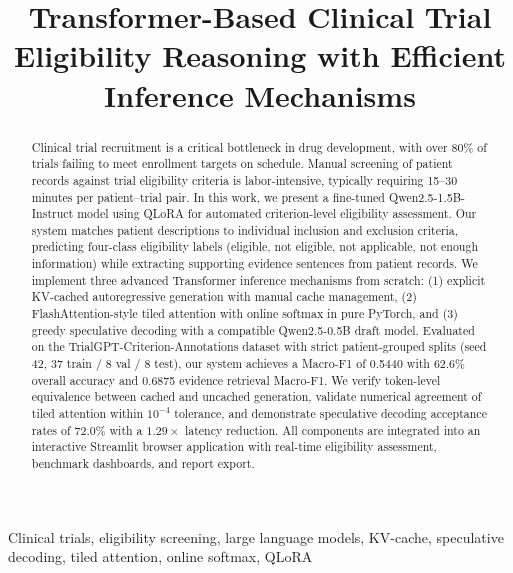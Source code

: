 \documentclass[conference]{IEEEtran}
\begin{document}
\title{Transformer-Based Clinical Trial Eligibility Reasoning with Efficient Inference Mechanisms}

\author{
}

\maketitle

\begin{abstract}
Clinical trial recruitment is a critical bottleneck in drug development, with over 80\% of trials failing to meet enrollment targets on schedule. Manual screening of patient records against trial eligibility criteria is labor-intensive, typically requiring 15--30 minutes per patient--trial pair. In this work, we present a fine-tuned Qwen2.5-1.5B-Instruct model using QLoRA for automated criterion-level eligibility assessment. Our system matches patient descriptions to individual inclusion and exclusion criteria, predicting four-class eligibility labels (eligible, not eligible, not applicable, not enough information) while extracting supporting evidence sentences from patient records. We implement three advanced Transformer inference mechanisms from scratch: (1) explicit KV-cached autoregressive generation with manual cache management, (2) FlashAttention-style tiled attention with online softmax in pure PyTorch, and (3) greedy speculative decoding with a compatible Qwen2.5-0.5B draft model. Evaluated on the TrialGPT-Criterion-Annotations dataset with strict patient-grouped splits (seed 42, 37 train / 8 val / 8 test), our system achieves a Macro-F1 of 0.5440 with 62.6\% overall accuracy and 0.6875 evidence retrieval Macro-F1. We verify token-level equivalence between cached and uncached generation, validate numerical agreement of tiled attention within $10^{-4}$ tolerance, and demonstrate speculative decoding acceptance rates of 72.0\% with a $1.29\times$ latency reduction. All components are integrated into an interactive Streamlit browser application with real-time eligibility assessment, benchmark dashboards, and report export.
\end{abstract}

\begin{IEEEkeywords}
Clinical trials, eligibility screening, large language models, KV-cache, speculative decoding, tiled attention, online softmax, QLoRA
\end{IEEEkeywords}

\end{document}
